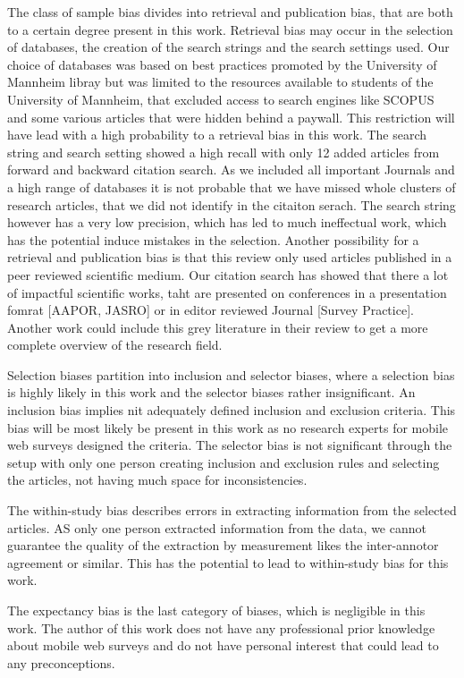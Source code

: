 The class of sample bias divides into retrieval and publication bias, that are both to a certain degree present in this work. Retrieval bias may occur in the selection of databases, the creation of the search strings and the search settings used. Our choice of databases was based on best practices promoted by the University of Mannheim libray but was limited to the resources available to students of the University of Mannheim, that excluded access to search engines like SCOPUS and some various articles that were hidden behind a paywall. This restriction will have lead with a high probability to a retrieval bias in this work. The search string and search setting showed a high recall with only 12 added articles from forward and backward citation search. As we included all important Journals and a high range of databases it is not probable that we have missed whole clusters of research articles, that we did not identify in the citaiton serach. The search string however has a very low precision, which has led to much ineffectual work, which has the potential induce mistakes in the selection. Another possibility for a retrieval and publication bias is that this review only used articles published in a peer reviewed scientific medium. Our citation search has showed that there a lot of impactful scientific works, taht are presented on conferences in a presentation fomrat [AAPOR, JASRO] or in editor reviewed Journal [Survey Practice]. Another work could include this grey literature in their review to get a more complete overview of the research field. 

Selection biases partition into inclusion and selector biases, where a selection bias is highly likely in this work and the selector biases rather insignificant. An inclusion bias implies nit adequately defined inclusion and exclusion criteria. This bias will be most likely be present in this work as no research experts for mobile web surveys designed the criteria. The selector bias is not significant through the setup with only one person creating inclusion and exclusion rules and selecting the articles, not having much space for inconsistencies.

The within-study bias describes errors in extracting information from the selected articles. AS only one person extracted information from the data, we cannot guarantee the quality of the extraction by measurement likes the inter-annotor agreement or similar. This has the potential to lead to within-study bias for this work.

The expectancy bias is the last category of biases, which is negligible in this work. The author of this work does not have any professional prior knowledge about mobile web surveys and do not have personal interest that could lead to any preconceptions.

